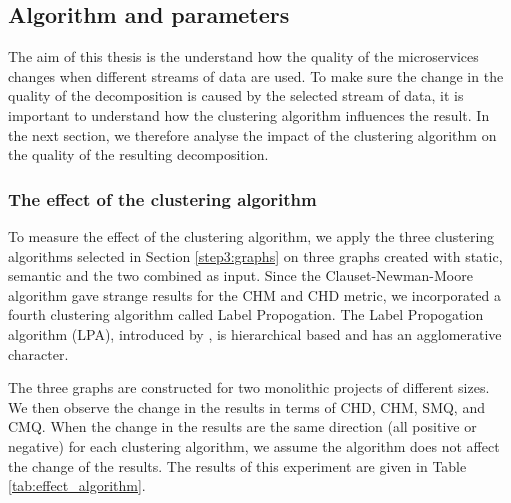 \subsection{Algorithm and parameters}
The aim of this thesis is the understand how the quality of the microservices changes when different streams of data are used. To make sure the change in the quality of the decomposition is caused by the selected stream of data, it is important to understand how the clustering algorithm influences the result. In the next section, we therefore analyse the impact of the clustering algorithm on the quality of the resulting decomposition.

\subsubsection{The effect of the clustering algorithm}
To measure the effect of the clustering algorithm, we apply the three clustering algorithms selected in Section \ref{step3:graphs} on three graphs created with static, semantic and the two combined as input. Since the Clauset-Newman-Moore algorithm gave strange results for the CHM and CHD metric, we incorporated a fourth clustering algorithm called Label Propogation. The Label Propogation algorithm (LPA), introduced by \citeauthor{raghavan2007near} \cite{raghavan2007near}, is hierarchical based and has an agglomerative character.\par
The three graphs are constructed for two monolithic projects of different sizes. We then observe the change in the results in terms of CHD, CHM, SMQ, and CMQ. When the change in the results are the same direction (all positive or negative) for each clustering algorithm, we assume the algorithm does not affect the change of the results. The results of this experiment are given in Table \ref{tab:effect_algorithm}. \par



